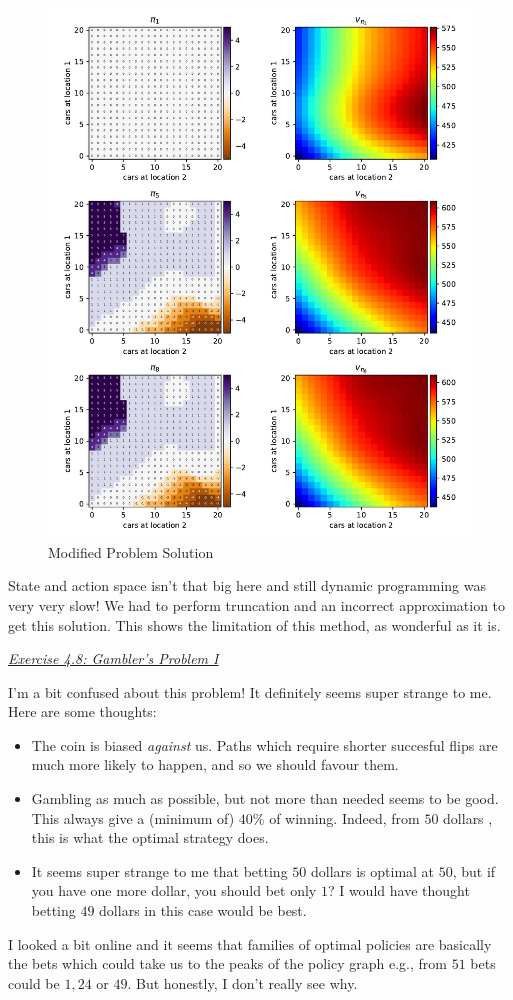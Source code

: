 \documentclass{article}
\newcommand{\myq}[1]{%
	\vspace{1em}
	\noindent\underline{\emph{Exercise #1}}\vspace{0.25em}\linebreak
}
\begin{document}
\begin{figure}
	\includegraphics[width=\textwidth]{modified}
	\centering
	\caption{\label{fig:modified_sol} Modified Problem Solution}
\end{figure} 

State and action space isn't that big here and still dynamic programming was very very slow! We had to perform truncation and an incorrect approximation to get this solution. This shows the limitation of this method, as wonderful as it is. 

\myq{4.8: Gambler's Problem I}
I'm a bit confused about this problem! It definitely seems super strange to me. Here are some thoughts:
\begin{itemize}[noitemsep]
	\item The coin is biased \textit{against} us. Paths which require shorter succesful flips are much more likely to happen, and so we should favour them. 
	\item Gambling as much as possible, but not more than needed seems to be good. This always give a (minimum of) $40\%$ of winning. Indeed, from $50$ dollars , this is what the optimal strategy does.
	\item It seems super strange to me that betting $50$ dollars is optimal at $50$, but if you have one more dollar, you should bet only $1$? I would have thought betting $49$ dollars in this case would be best. 
\end{itemize}
I looked a bit online and it seems that families of optimal policies are basically the bets which could take us to the peaks of the policy graph e.g., from $51$ bets could be $1, 24$ or $49$. But honestly, I don't really see why. 
\end{document}
